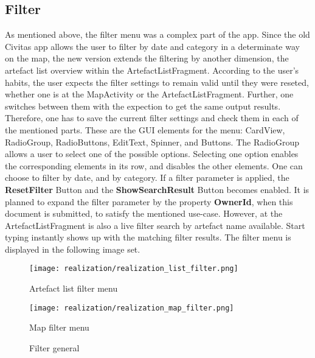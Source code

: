 \subsection{Filter}
As mentioned above, the filter menu was a complex part of the app. Since the old Civitas app allows the user to filter by date and category in a determinate way on the map, the new version extends the filtering by another dimension, the artefact list overview within the ArtefactListFragment. According to the user's habits, the user expects the filter settings to remain valid until they were reseted, whether one is at the MapActivity or the ArtefactListFragment. Further, one switches between them with the expection to get the same output results. Therefore, one has to save the current filter settings and check them in each of the mentioned parts. These are the GUI elements for the menu: CardView, RadioGroup, RadioButtons, EditText, Spinner, and Buttons. 
The RadioGroup allows a user to select one of the possible options. Selecting one option enables the corresponding elements in its row, and disables the other elements. One can choose to filter by date, and by category. If a filter parameter is applied, the \textbf{ResetFilter} Button and the \textbf{ShowSearchResult} Button becomes enabled. It is planned to expand the filter parameter by the property \textbf{OwnerId}, when this document is submitted, to satisfy the mentioned use-case. However, at the ArtefactListFragment is also a live filter search by artefact name available. Start typing instantly shows up with the matching filter results.
The filter menu is displayed in the following image set.

\begin{figure}[!htb]
  \texttt{[image: realization/realization\_list\_filter.png]}
  \caption{Artefact list filter menu}\label{fig:awesome_image1}
\endminipage\hfill
{}
  \texttt{[image: realization/realization\_map\_filter.png]}
  \caption{Map filter menu}\label{fig:awesome_image2}
\endminipage\hfill
\caption{Filter general}
\label{fig:filter general}
\end{figure}









